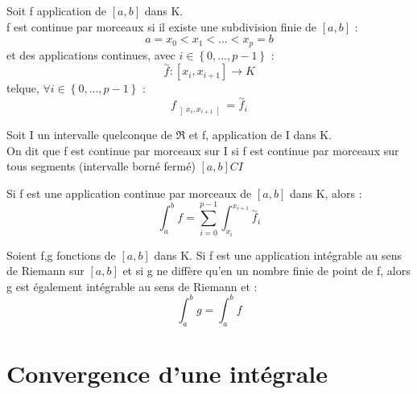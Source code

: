 \begin{de}
Soit f application de $\left[a,b\right]$ dans K.\\
f est continue par morceaux si il existe une subdivision finie de $\left[a,b\right]$ :
$$a = x_0 < x_1 < ... < x_p = b$$
et des applications continues, avec $i \in \left\lbrace0,...,p-1\right\rbrace$ : 
$$\overset{\sim}f : \left[x_i,x_{i+1}\right] \rightarrow K$$
telque, $\forall i \in \left\lbrace0,...,p-1\right\rbrace$ : 
$$f_{\left]x_i,x_{i+1}\right[} = \overset{\sim} f_i$$
\end{de}
\begin{de}
Soit I un intervalle quelconque de $\Re$ et f, application de I dans K.\\
On dit que f est continue par morceaux sur I si f est continue par morceaux sur tous segments (intervalle borné fermé) $\left[a,b\right] C I$
\end{de}
\begin{prop}
Si f est une application continue par morceaux de $\left[a,b\right]$ dans K, alors :
$$\int_a^b f = \sum_{i=0}^{p-1} \int_{x_i}^{x_{i+1}} \overset{\sim}f_i$$
\end{prop}
\begin{prop}
Soient f,g fonctions de $\left[a,b\right]$ dans K.
Si f est une application intégrable au sens de Riemann sur $\left[a,b\right]$ et si g ne diffère qu'en un nombre finie de point de f, alors g est également intégrable au sens de Riemann et : 
$$\int_a^b g = \int_a^b f$$
\end{prop}
\section{Convergence d'une intégrale}
